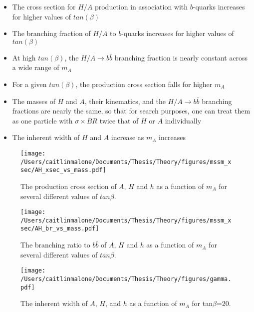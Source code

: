 \begin{itemize}
	\item The cross section for $H/A$ production in association with $b$-quarks increases for higher values of $tan(\beta)$
	\item The branching fraction of $H/A$ to $b$-quarks increases for higher values of $tan(\beta)$
	\item At high $tan(\beta)$, the $H/A\rightarrow b\bar{b}$ branching fraction is nearly constant across a wide range of $m_A$
	\item For a given $tan(\beta)$, the production cross section falls for higher $m_A$
	\item The masses of $H$ and $A$, their kinematics, and the $H/A\rightarrow b\bar{b}$ branching fractions are nearly the same, so that for search purposes, one can treat them as one particle with $\sigma \times BR$ twice that of $H$ or $A$ individually
	\item The inherent width of $H$ and $A$ increase as $m_A$ increases 
\end{itemize}





\begin{figure}
	\centering
	\caption{The production cross section of $A$, $H$ and $h$ as a function of $m_A$ for several different values of $tan\beta$. \label{fig:xsec_vs_mass} }
	\texttt{[image: /Users/caitlinmalone/Documents/Thesis/Theory/figures/mssm\_xsec/AH\_xsec\_vs\_mass.pdf]}
\end{figure}




\begin{figure}
	\centering
	\caption{The branching ratio to $b\bar{b}$ of $A$, $H$ and $h$ as a function of $m_A$ for several different values of $tan\beta$. \label{fig:br_vs_mass} }
	\texttt{[image: /Users/caitlinmalone/Documents/Thesis/Theory/figures/mssm\_xsec/AH\_br\_vs\_mass.pdf]}
\end{figure}


\begin{figure}
	\centering
	\caption{The inherent width of $A$, $H$, and $h$ as a function of $m_A$ for tan$\beta$=20. \label{fig:width}}
	\texttt{[image: /Users/caitlinmalone/Documents/Thesis/Theory/figures/gamma.pdf]}
\end{figure}



